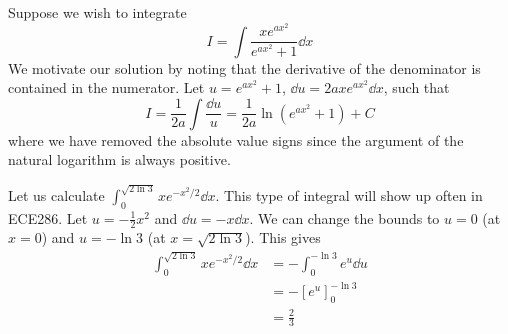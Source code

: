 \begin{itemize}
    \begin{example}
        Suppose we wish to integrate 
        \begin{equation}
            I = \int \frac{xe^{ax^2}}{e^{ax^2}+1} \dd{x}
        \end{equation}
        We motivate our solution by noting that the derivative of the denominator is contained in the numerator. Let $u=e^{ax^2}+1$, $\dd{u} = 2axe^{ax^2}\dd{x}$, such that
        \begin{equation}
            I = \frac{1}{2a} \int \frac{\dd{u}}{u} = \frac{1}{2a}\ln(e^{ax^2}+1) + C
        \end{equation}
        where we have removed the absolute value signs since the argument of the natural logarithm is always positive.
    \end{example}
    \begin{example}
        Let us calculate $\int_0^{\sqrt{2\ln 3}} xe^{-x^2/2} \dd{x}$. This type of integral will show up often in ECE286. Let $u=-\frac{1}{2}x^2$ and $\dd{u} = - x \dd{x}$. We can change the bounds to $u=0$ (at $x=0$) and $u=-\ln 3$ (at $x=\sqrt{2\ln 3}$). This gives 
        \begin{align}
            \int_0^{\sqrt{2\ln 3}} x e^{-x^2/2} \dd{x} &= - \int_0^{-\ln 3} e^u \dd{u} \\ 
            &= -[e^u]^{-\ln 3}_0 \\ 
            &= \frac{2}{3}
        \end{align}
    \end{example}
\end{itemize}